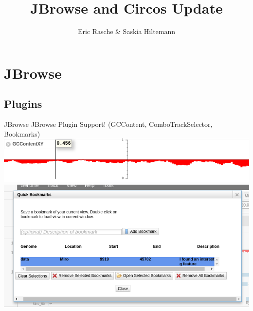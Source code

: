 \documentclass[12pt]{phage3slides} %
\title[JBrowse and Circos Update]{JBrowse and Circos Update}
\author[ER/SH]{Eric Rasche \& Saskia Hiltemann}
\begin{document}
\frame{\titlepage}


\section{JBrowse}
{
  \begin{frame}[plain]
  \end{frame}
}

\subsection{Plugins}
{
\begin{frame}{JBrowse}
	JBrowse Plugin Support! ({\color{gray}GCContent, ComboTrackSelector, Bookmarks})
	\includegraphics[width=\textwidth]{plugin-gc.png} \\
	\includegraphics[width=\textwidth]{plugin-book.png}
\end{frame}
}
\end{document}
